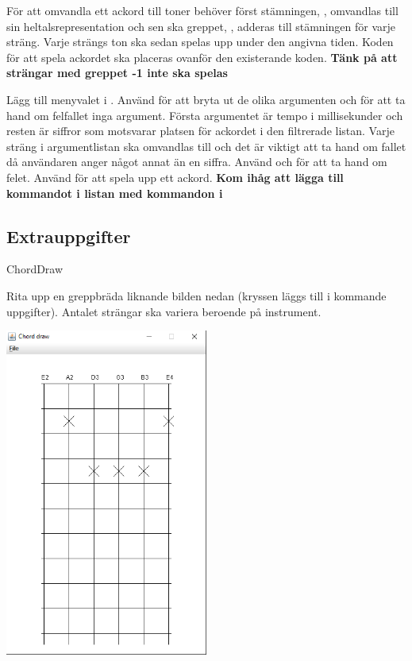 {\Subtask För att omvandla ett ackord till toner behöver först stämningen, , omvandlas till sin heltalsrepresentation och sen ska greppet, , adderas till stämningen för varje sträng. Varje strängs ton ska sedan spelas upp under den angivna tiden. Koden för att spela ackordet ska placeras ovanför den existerande koden. \textbf{Tänk på att strängar med greppet -1 inte ska spelas}

\Subtask Lägg till menyvalet  i . Använd  för att bryta ut de olika argumenten och för att ta hand om felfallet inga argument. Första argumentet är tempo i millisekunder och resten är siffror som motsvarar platsen för ackordet i den filtrerade listan. Varje sträng i argumentlistan ska omvandlas till  och det är viktigt att ta hand om fallet då användaren anger något annat än en siffra. Använd  och  för att ta hand om felet. Använd  för att spela upp ett ackord. \textbf{Kom ihåg att lägga till kommandot i listan med kommandon i }

\subsection{Extrauppgifter}

\Task ChordDraw

\Subtask Rita upp en greppbräda liknande bilden nedan (kryssen läggs till i kommande uppgifter). Antalet strängar ska variera beroende på instrument.

\includegraphics[width=0.5\textwidth]{../img/chords/ChordDraw}

}

